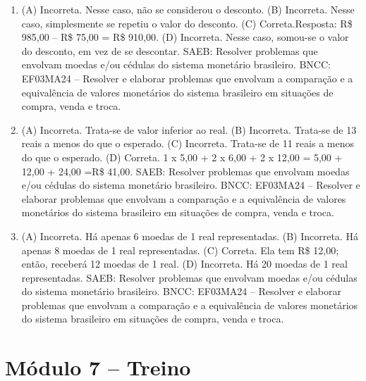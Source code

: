 \begin{enumerate}
\item
(A) Incorreta. Nesse caso, não se considerou o desconto.
(B) Incorreta. Nesse caso, simplesmente se repetiu o valor do desconto.
(C) Correta.Resposta: R\$ 985,00 -- R\$ 75,00 = R\$ 910,00.
(D) Incorreta. Nesse caso, somou-se o valor do desconto, em vez de se descontar.
SAEB: Resolver problemas que envolvam moedas e/ou cédulas do sistema monetário brasileiro. 
BNCC: EF03MA24 -- Resolver e elaborar problemas que envolvam a comparação e a equivalência de
valores monetários do sistema brasileiro em situações de compra, venda e troca.

\item
(A) Incorreta. Trata-se de valor inferior ao real.
(B) Incorreta. Trata-se de 13 reais a menos do que o esperado.
(C) Incorreta. Trata-se de 11 reais a menos do que o esperado.
(D) Correta.
1 x 5,00 + 2 x 6,00 + 2 x 12,00 = 5,00 + 12,00 + 24,00 =R\$ 41,00.
SAEB: Resolver problemas que envolvam moedas e/ou cédulas do sistema monetário brasileiro. 
BNCC: EF03MA24 -- Resolver e elaborar problemas que envolvam a comparação e a equivalência de
valores monetários do sistema brasileiro em situações de compra, venda e troca.

\item
(A) Incorreta. Há apenas 6 moedas de 1 real representadas.
(B) Incorreta. Há apenas 8 moedas de 1 real representadas.
(C) Correta. Ela tem R\$ 12,00; então, receberá 12 moedas de 1 real.
(D) Incorreta. Há 20 moedas de 1 real representadas.
SAEB: Resolver problemas que envolvam moedas e/ou cédulas do sistema monetário brasileiro. 
BNCC: EF03MA24 -- Resolver e elaborar problemas que envolvam a comparação e a equivalência de
valores monetários do sistema brasileiro em situações de compra, venda e troca.
\end{enumerate}

\section*{Módulo 7 -- Treino}

